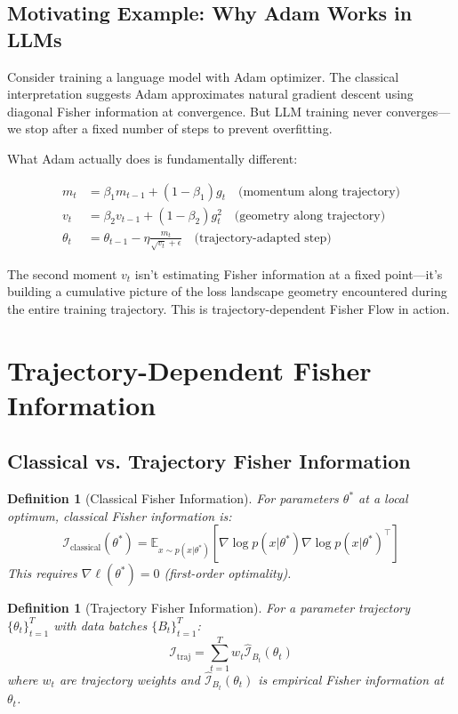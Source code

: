 \documentclass[11pt]{article}
\newtheorem{definition}[theorem]{Definition}
\begin{document}
\subsection{Motivating Example: Why Adam Works in LLMs}

Consider training a language model with Adam optimizer. The classical interpretation suggests Adam approximates natural gradient descent using diagonal Fisher information at convergence. But LLM training never converges—we stop after a fixed number of steps to prevent overfitting.

What Adam actually does is fundamentally different:

\begin{align}
m_t &= \beta_1 m_{t-1} + (1-\beta_1) g_t \quad \text{(momentum along trajectory)}\\
v_t &= \beta_2 v_{t-1} + (1-\beta_2) g_t^2 \quad \text{(geometry along trajectory)}\\
\theta_t &= \theta_{t-1} - \eta \frac{m_t}{\sqrt{v_t} + \epsilon} \quad \text{(trajectory-adapted step)}
\end{align}

The second moment $v_t$ isn't estimating Fisher information at a fixed point—it's building a cumulative picture of the loss landscape geometry encountered during the entire training trajectory. This is trajectory-dependent Fisher Flow in action.

\section{Trajectory-Dependent Fisher Information}

\subsection{Classical vs. Trajectory Fisher Information}

\begin{definition}[Classical Fisher Information]
For parameters $\theta^*$ at a local optimum, classical Fisher information is:
\begin{equation}
\mathcal{I}_{\text{classical}}(\theta^*) = \mathbb{E}_{x \sim p(x|\theta^*)}[\nabla \log p(x|\theta^*) \nabla \log p(x|\theta^*)^\top]
\end{equation}
This requires $\nabla \ell(\theta^*) = 0$ (first-order optimality).
\end{definition}

\begin{definition}[Trajectory Fisher Information]
For a parameter trajectory $\{\theta_t\}_{t=1}^T$ with data batches $\{B_t\}_{t=1}^T$:
\begin{equation}
\mathcal{I}_{\text{traj}} = \sum_{t=1}^T w_t \hat{\mathcal{I}}_{B_t}(\theta_t)
\end{equation}
where $w_t$ are trajectory weights and $\hat{\mathcal{I}}_{B_t}(\theta_t)$ is empirical Fisher information at $\theta_t$.
\end{definition}
\end{document}

